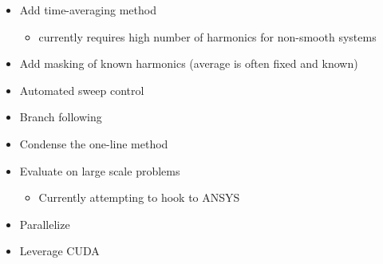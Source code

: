 \documentclass[11pt]{article}
\providecommand{\tightlist}{%
      \setlength{\itemsep}{0pt}\setlength{\parskip}{0pt}}
\begin{document}
\begin{itemize}
\tightlist
\item
  Add time-averaging method

  \begin{itemize}
  \tightlist
  \item
    currently requires high number of harmonics for non-smooth systems
  \end{itemize}
\item
  Add masking of known harmonics (average is often fixed and known)
\item
  Automated sweep control
\item
  Branch following
\item
  Condense the one-line method
\item
  Evaluate on large scale problems

  \begin{itemize}
  \tightlist
  \item
    Currently attempting to hook to ANSYS
  \end{itemize}
\item
  Parallelize
\item
  Leverage CUDA
\end{itemize}


    
    
    
    
\end{document}
